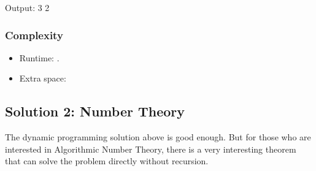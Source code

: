 \documentclass[letterpaper,12pt,english]{book}
\begin{document}
\begin{sphinxVerbatim}[commandchars=\\\{\}]
\PYG{p}{[}\PYG{p}{]}
\PYG{p}{[}\PYG{p}{]}
\end{sphinxVerbatim}

\begin{sphinxVerbatim}[commandchars=\\\{\}]
Output:
3
2
\end{sphinxVerbatim}


\subsubsection{Complexity}
\label{\detokenize{Mathematics/09_MTH_279_Perfect_Squares:complexity}}\begin{itemize}
\item {} 
\sphinxAtStartPar
Runtime: .

\item {} 
\sphinxAtStartPar
Extra space: 

\end{itemize}


\subsection{Solution 2: Number Theory}
\label{\detokenize{Mathematics/09_MTH_279_Perfect_Squares:solution-2-number-theory}}
\sphinxAtStartPar
The dynamic programming solution above is good enough. But for those who are interested in Algorithmic Number Theory, there is a very interesting theorem that can solve the problem directly without recursion.
\end{document}
